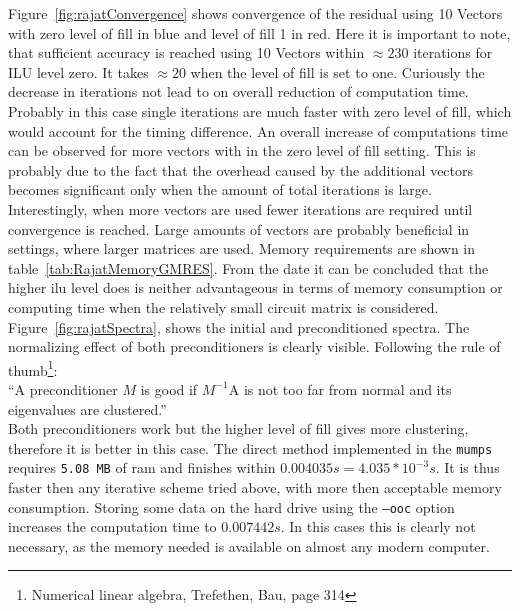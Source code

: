 Figure~\ref{fig:rajatConvergence} shows convergence of the residual using 10 Vectors with zero level of fill in blue and level of fill 1 in red. Here it is important to note, that sufficient accuracy is reached using 10 Vectors within $\approx 230$ iterations for ILU level zero. It takes $\approx 20$ when the level of fill is set to one. Curiously the decrease in iterations not lead to on overall reduction of computation time. Probably in this case single iterations are much faster with zero level of fill, which would account for the timing difference. An overall increase of computations time can be observed for more vectors with in the zero level of fill setting. This is probably due to the fact that the overhead caused by the additional vectors becomes significant only when the amount of total iterations is large. Interestingly, when more vectors are used fewer iterations are required until convergence is reached. Large amounts of vectors are probably beneficial in settings, where larger matrices are used.
Memory requirements are shown in table~\ref{tab:RajatMemoryGMRES}. From the date it can be concluded that the higher ilu level does is neither 
advantageous in terms of memory consumption or computing time when the relatively small circuit matrix is considered. \\
Figure~\ref{fig:rajatSpectra}, shows the initial and preconditioned spectra. The normalizing effect of both preconditioners is clearly visible. Following the rule of thumb\footnote{Numerical linear algebra, Trefethen, Bau, page 314}: \\
\textquotedblleft A preconditioner $M$ is good if $M^{-1}$A is not too far from normal and its eigenvalues are clustered.\textquotedblright \\
Both preconditioners work but the higher level of fill gives more clustering, therefore it is better in this case.
The direct method implemented in the \texttt{mumps} requires \texttt{5.08 MB}  of ram and finishes within $0.004035s = 4.035*10^{-3}s$. It is thus faster then any iterative scheme tried above, with more then acceptable memory consumption. Storing some data on the hard drive using the \texttt{--ooc} option increases the computation time to $0.007442s$. In this cases this is clearly not necessary, as the memory needed is available on almost any modern computer.

